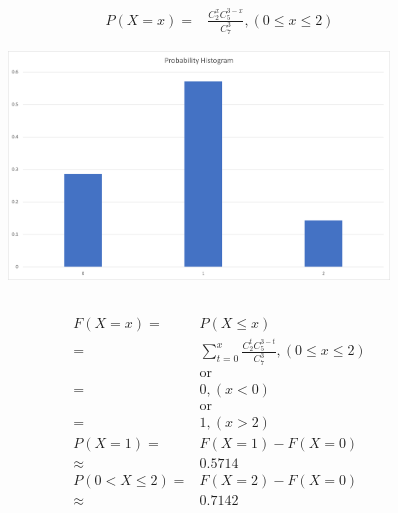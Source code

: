 \documentclass{article}
\begin{document}
        \subsection{}
            \begin{equation*}
                \begin{split}
                    P(X=x)=&\frac{C_2^{x}C_5^{3-x}}{C_7^3},(0\leq x\leq 2)
                \end{split}
            \end{equation*}
            \begin{figure}[H]
                \centering
                \includegraphics[width=0.9\textwidth]{img/Assignment3-01.png}
            \end{figure}
        \subsection{}
            \begin{equation*}
                \begin{split}
                    F(X=x)=&P(X\leq x)\\
                        =&\sum_{t=0}^x\frac{C_2^{t}C_5^{3-t}}{C_7^3},(0\leq x\leq 2)\\
                        &\textrm{or}\\
                        =&0,(x<0)\\
                        &\textrm{or}\\
                        =&1,(x>2)\\
                    P(X=1)=&F(X=1)-F(X=0)\\
                        \approx&0.5714\\
                    P(0<X\leq 2)=&F(X=2)-F(X=0)\\
                        \approx&0.7142\\
                \end{split}
            \end{equation*}
\end{document}
